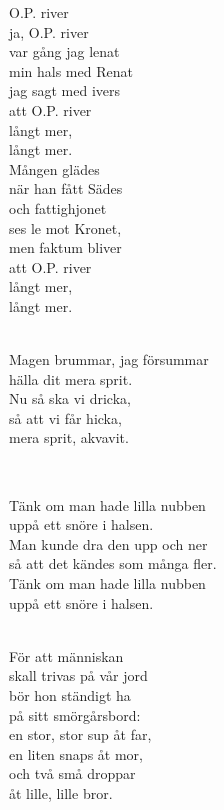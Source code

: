 \songtext{}
O.P. river \\
ja, O.P. river \\
var gång jag lenat \\
min hals med Renat \\
jag sagt med ivers \\
att O.P. river \\
långt mer, \\
långt mer. \\
Mången glädes \\
när han fått Sädes \\
och fattighjonet \\
ses le mot Kronet, \\
men faktum bliver \\
att O.P. river \\
långt mer, \\
långt mer. \\

 \\       

\songtext{}
Magen brummar, jag försummar\\
hälla dit mera sprit.\\
Nu så ska vi dricka,\\
så att vi får hicka,\\
mera sprit, akvavit.

\newpage 


 \\       

\songtext{}
\leftrepeat Tänk om man hade lilla nubben \\
uppå ett snöre i halsen. \rightrepeat \\
Man kunde dra den upp och ner \\
så att det kändes som många fler. \\
Tänk om man hade lilla nubben \\
uppå ett snöre i halsen. \\


 \\       

\songtext{}För att människan \\
skall trivas på vår jord \\
bör hon ständigt ha \\
på sitt smörgårsbord: \\
en stor, stor sup åt far, \\
en liten snaps åt mor, \\
och två små droppar \\
åt lille, lille bror. \\

